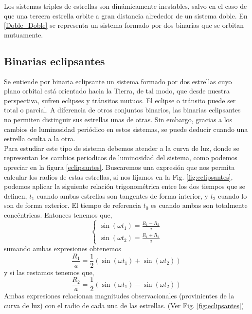 \documentclass[openany]{book}
\theoremstyle{ucostyle}
\begin{document}
Los sistemas triples de estrellas son dinámicamente inestables, salvo en el caso de que una
tercera estrella orbite a gran distancia alrededor de un sistema doble. En \ref{Doble_Doble} se representa un
sistema formado por dos binarias que se orbitan mutuamente.

\subsection{Binarias eclipsantes}
Se entiende por binaria eclipsante un sistema formado por dos estrellas cuyo plano orbital está orientado hacia la Tierra, de tal modo, que desde nuestra perspectiva, sufren eclipses y tránsitos mutuos. El eclipse o tránsito puede ser total o parcial. A diferencia de otros conjuntos binarios, las binarias eclipsantes no permiten distinguir sus estrellas unas de otras. Sin embargo, gracias a los cambios de luminosidad periódico en estos sistemas, se puede deducir cuando una estrella oculta a la otra. 
\\

Para estudiar este tipo de sistema debemos atender a la curva de luz, donde se representan los cambios periodicos de luminosidad del sistema, como podemos apreciar en la figura \ref{eclipsantes}. Buscaremos una expresión que nos permita calcular los radios de estas estrellas, si nos fijamos en la Fig. \ref{fig:eclipsantes}, podemos aplicar la siguiente relación trigonométrica entre los dos tiempos que se definen, $t_1$ cuando ambas estrellas son tangentes de forma interior, y $t_2$ cuando lo son de forma exterior. El tiempo de referencia $t_0$ es cuando ambas son totalmente concéntricas. Entonces tenemos que, 
\begin{equation}
    \begin{cases}
        \sin(\omega t_1)=\frac{R_1-R_2}{a}
        \\
        \sin(\omega t_2)=\frac{R_1+R_2}{a}
    \end{cases}
\end{equation}
sumando ambas expresiones obtenemos
\begin{equation}
    \frac{R_1}{a}=\frac{1}{2}(\sin(\omega t_1)+ \sin(\omega t_2))
\end{equation}
y si las restamos tenemos que, 
\begin{equation}
    \frac{R_2}{a}=\frac{1}{2}(\sin(\omega t_1)-\sin(\omega t_2))
\end{equation}
Ambas expresiones relacionan magnitudes observacionales (provinientes de la curva de luz) con el radio de cada una de las estrellas. (Ver Fig. \ref{fig:eclipsantes})
\end{document}
